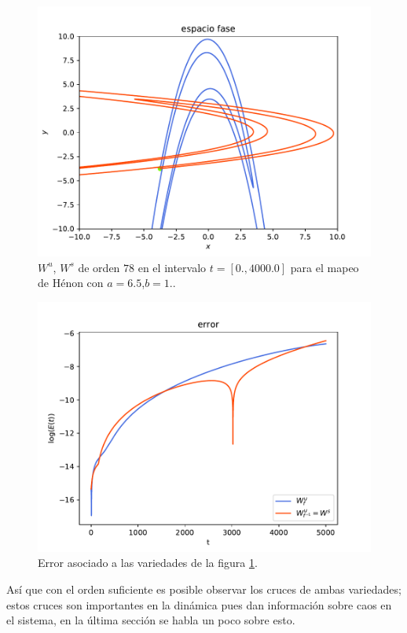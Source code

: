 \begin{figure}[H]
\centering
\includegraphics[scale=0.7]{h65}
\caption{$W^{u}$, $W^{s}$ de orden $78$ en el intervalo $t=[0.,4000.0]$ para el mapeo de Hénon con $a=6.5$,$b=1.$.}
\label{Henon3}
\end{figure}

\begin{figure}[H]
\centering
\includegraphics[scale=0.6]{errorH65}
\caption{Error asociado a las variedades de la figura \ref{Henon3}.}
\label{ErrorHenon3}
\end{figure}


Así que con el orden suficiente es posible observar los cruces de ambas variedades; estos cruces son importantes en la dinámica pues dan información sobre caos en el sistema,  en la última sección se habla un poco sobre esto. 


